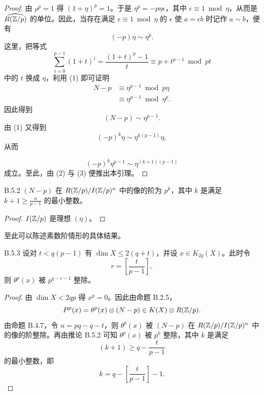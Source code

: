 \begin{proof}
  由 $\rho^p=1$ 得 $(1+\eta)^p=1$。于是 $\eta^p=-p\eta\epsilon$，其中 $\epsilon\equiv1\bmod\eta$，从而是 $\widehat{R(\mathbb{Z}/p)}$ 的单位。因此，当存在满足 $\epsilon\equiv1\bmod\eta$ 的 $\epsilon$ 使 $a=\epsilon b$ 时记作 $a\sim b$，便有
  \begin{equation}
    (-p)\eta\sim\eta^p. \tag{1}
  \end{equation}
  这里，把等式
  \[
    \sum_{i=0}^{p-1}(1+t)^i=\frac{(1+t)^p-1}{t}\equiv p+t^{p-1}\bmod pt
  \]
  中的 $t$ 换成 $\eta$，利用 (1) 即可证明
  \begin{align*}
    N-p&\equiv\eta^{p-1}\bmod p\eta\\
    &\equiv\eta^{p-1}\bmod\eta^p.
  \end{align*}
  因此得到
  \begin{equation}
    (N-p)\sim\eta^{p-1}. \tag{2}
  \end{equation}
  由 (1) 又得到
  \[
    (-p)^k\eta\sim\eta^{k(p-1)}\eta,
  \]
  从而

  \begin{equation}
    (-p)^k\eta^{p-1}\sim\eta^{(k+1)(p-1)} \tag{3}
  \end{equation}
  成立。至此，由 (2) 与 (3) 便推出本引理。
\end{proof}

\begin{corollary*}{B.5.2}
  $(N-p)$ 在 $R(\mathbb{Z}/p)/I(\mathbb{Z}/p)^n$ 中的像的阶为 $p^k$，其中 $k$ 是满足 $k+1\ge\frac{n}{p-1}$ 的最小整数。
\end{corollary*}

\begin{proof}
  $I(\mathbb{Z}/p)$ 是理想 $(\eta)$。
\end{proof}


至此可以陈述素数阶情形的具体结果。

\begin{theorem*}{B.5.3}
  设对 $t<q(p-1)$ 有 $\dim X\le2(q+t)$，并设 $x\in K_{2q}(X)$。此时令
  \[
    r=\left[\frac{t}{p-1}\right],
  \]
  则 $\theta^p(x)$ 被 $p^{q-r-1}$ 整除。
\end{theorem*}

\begin{proof}
  由 $\dim X<2qp$ 得 $x^p=0$。因此由命题 B.2.5，
  \[
    P^p(x)=\theta^p(x)\otimes(N-p)\in K(X)\otimes R(\mathbb{Z}/p).
  \]
  由命题 B.4.7，令 $n=pq-q-t$，则 $\theta^p(x)$ 被 $(N-p)$ 在 $R(\mathbb{Z}/p)/I(\mathbb{Z}/p)^n$ 中的像的阶整除。再由推论 B.5.2 可知 $\theta^p(x)$ 被 $p^k$ 整除，其中 $k$ 是满足
  \[
    (k+1)\ge q-\frac{t}{p-1}
  \]
  的最小整数，即
  \[
    k=q-\left[\frac{t}{p-1}\right]-1.
  \]
\end{proof}

